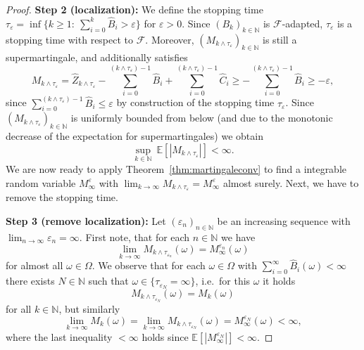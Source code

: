 \documentclass[12pt,openany]{book}
\theoremstyle{definition}
\theoremstyle{definition}
\newcommand{\E}{\mathbb{E}}
\newcommand{\N}{\mathbb{N}}
\begin{document}
\begin{proof}
\textbf{Step 2 (localization):} We define the stopping time $\tau_\varepsilon = \inf\{k\ge 1: \ \sum_{i=0}^k \widehat B_i >\varepsilon\}$ for $\varepsilon>0$. Since $(B_k)_{k\in\N}$ is $\mathcal F$-adapted, $\tau_\varepsilon$ is a stopping time with respect to $\mathcal F$. Moreover, $(M_{k\wedge \tau_\varepsilon})_{k\in\N}$ is still a supermartingale, and additionally satisfies 
\[M_{k\wedge \tau_\varepsilon} = \widehat Z_{k\wedge \tau_\varepsilon} - \sum_{i=0}^{(k\wedge \tau_\varepsilon)-1}\widehat B_i + \sum_{i=0}^{(k\wedge\tau_\varepsilon)-1} \widehat C_i\ge -\sum_{i=0}^{(k\wedge\tau_\varepsilon)-1}\widehat B_i \ge -\varepsilon, \]
since $\sum_{i=0}^{(k\wedge\tau_\varepsilon)-1}\widehat B_i\le \varepsilon$ by construction of the stopping time $\tau_\varepsilon$. Since $(M_{k\wedge \tau_\varepsilon})_{k\in\N}$ is uniformly bounded from below (and due to the monotonic decrease of the expectation for supermartingales) we obtain
\[\sup_{k\in\N}\ \E[|M_{k\wedge\tau_\varepsilon}|]<\infty. \]
We are now ready to apply Theorem~\ref{thm:martingaleconv} to find a integrable random variable $M^\varepsilon_\infty$ with $\lim_{k\to\infty} M_{k\wedge\tau_{\varepsilon}} = M_\infty^\varepsilon$ almost surely. Next, we have to remove the stopping time.

\textbf{Step 3 (remove localization):} Let $(\varepsilon_n)_{n\in\N}$ be an increasing sequence with $\lim_{n\to\infty} \varepsilon_n = \infty$. First note, that for each $n\in\N$ we have
\[\lim_{k\to\infty} M_{k\wedge\tau_{\varepsilon_n}}(\omega) = M_\infty^{\varepsilon_n}(\omega) \]
for almost all $\omega\in\Omega$. We observe that for each $\omega\in\Omega$ with 
$\sum_{i=0}^\infty\widehat B_i(\omega) <\infty$ there exists $N\in\N$ such that $\omega\in\{\tau_{\varepsilon_N}=\infty\}$, i.e.~for this $\omega$ it holds
\[M_{k\wedge \tau_{\varepsilon_N}}(\omega) = M_k(\omega) \]
for all $k\in\N$, but similarly
\[\lim_{k\to\infty} M_k(\omega) = \lim_{k\to\infty} M_{k\wedge\tau_{\varepsilon_N}}(\omega) = M_\infty^{\varepsilon_N}(\omega) <\infty, \]
where the last inequality $<\infty$ holds since $\E[|M_\infty^{\varepsilon_N}|] <\infty$.


\end{proof}
\end{document}
